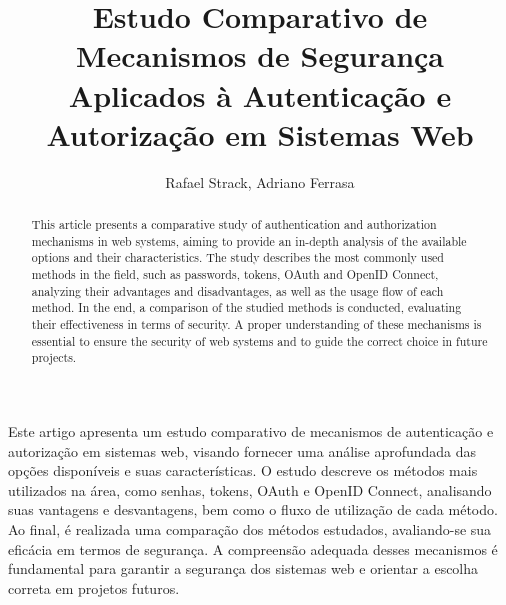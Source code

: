 \documentclass[12pt]{article}
\title{Estudo Comparativo de Mecanismos de Segurança Aplicados à Autenticação e Autorização em 
Sistemas Web}
\author{Rafael Strack\inst{1}, Adriano Ferrasa\inst{1}}
\begin{document}
\maketitle

\begin{abstract}
  This article presents a comparative study of authentication and authorization mechanisms in web
  systems, aiming to provide an in-depth analysis of the available options and their
  characteristics. The study describes the most commonly used methods in the field, such as passwords, 
  tokens, OAuth and OpenID Connect, analyzing their advantages and disadvantages, as well as the usage 
  flow of each method. In the end, a comparison of the studied methods is conducted, evaluating their 
  effectiveness in terms of security. A proper understanding of these mechanisms is essential to ensure 
  the security of web systems and to guide the correct choice in future projects.
\end{abstract}

\begin{resumo}
  Este artigo apresenta um estudo comparativo de mecanismos de autenticação e autorização em
  sistemas web, visando fornecer uma análise aprofundada das opções disponíveis e suas
  características. O estudo descreve os métodos mais utilizados na área, como senhas, tokens, OAuth 
  e OpenID Connect, analisando suas vantagens e desvantagens, bem como o fluxo de utilização de 
  cada método. Ao final, é realizada uma comparação dos métodos estudados, avaliando-se sua eficácia 
  em termos de segurança. A compreensão adequada desses mecanismos é fundamental para garantir a 
  segurança dos sistemas web e orientar a escolha correta em projetos futuros.
\end{resumo}

























\end{document}
